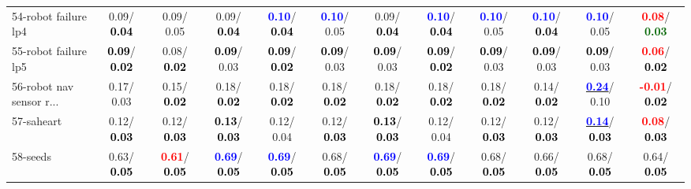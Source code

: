 \begin{table}[h]
\begin{center}
{\begin{tabular}{lc|c|c|c|c|c|c|c|c|c|c}
54-robot failure lp4 &   0.09/\textcolor{black}{\textbf{  0.04}} &   0.09/  0.05 &   0.09/\textcolor{black}{\textbf{  0.04}} & \textcolor{blue}{\textbf{  0.10}}/\textcolor{black}{\textbf{  0.04}} & \textcolor{blue}{\textbf{  0.10}}/  0.05 &   0.09/\textcolor{black}{\textbf{  0.04}} & \textcolor{blue}{\textbf{  0.10}}/\textcolor{black}{\textbf{  0.04}} & \textcolor{blue}{\textbf{  0.10}}/  0.05 & \textcolor{blue}{\textbf{  0.10}}/\textcolor{black}{\textbf{  0.04}} & \textcolor{blue}{\textbf{  0.10}}/  0.05 & \textcolor{red}{\textbf{  0.08}}/\textcolor{darkgreen}{\textbf{  0.03}} \\
55-robot failure lp5 & \textcolor{black}{\textbf{  0.09}}/\textcolor{black}{\textbf{  0.02}} &   0.08/\textcolor{black}{\textbf{  0.02}} & \textcolor{black}{\textbf{  0.09}}/  0.03 & \textcolor{black}{\textbf{  0.09}}/\textcolor{black}{\textbf{  0.02}} & \textcolor{black}{\textbf{  0.09}}/  0.03 & \textcolor{black}{\textbf{  0.09}}/  0.03 & \textcolor{black}{\textbf{  0.09}}/\textcolor{black}{\textbf{  0.02}} & \textcolor{black}{\textbf{  0.09}}/  0.03 & \textcolor{black}{\textbf{  0.09}}/  0.03 & \textcolor{black}{\textbf{  0.09}}/  0.03 & \textcolor{red}{\textbf{  0.06}}/\textcolor{black}{\textbf{  0.02}} \\
56-robot nav sensor r... &   0.17/  0.03 &   0.15/\textcolor{black}{\textbf{  0.02}} &   0.18/\textcolor{black}{\textbf{  0.02}} &   0.18/\textcolor{black}{\textbf{  0.02}} &   0.18/\textcolor{black}{\textbf{  0.02}} &   0.18/\textcolor{black}{\textbf{  0.02}} &   0.18/\textcolor{black}{\textbf{  0.02}} &   0.18/\textcolor{black}{\textbf{  0.02}} &   0.14/\textcolor{black}{\textbf{  0.02}} & \underline{\textcolor{blue}{\textbf{  0.24}}}/  0.10 & \textcolor{red}{\textbf{ -0.01}}/\textcolor{black}{\textbf{  0.02}} \\
57-saheart &   0.12/\textcolor{black}{\textbf{  0.03}} &   0.12/\textcolor{black}{\textbf{  0.03}} & \textcolor{black}{\textbf{  0.13}}/\textcolor{black}{\textbf{  0.03}} &   0.12/  0.04 &   0.12/\textcolor{black}{\textbf{  0.03}} & \textcolor{black}{\textbf{  0.13}}/\textcolor{black}{\textbf{  0.03}} &   0.12/  0.04 &   0.12/\textcolor{black}{\textbf{  0.03}} &   0.12/\textcolor{black}{\textbf{  0.03}} & \underline{\textcolor{blue}{\textbf{  0.14}}}/\textcolor{black}{\textbf{  0.03}} & \textcolor{red}{\textbf{  0.08}}/\textcolor{black}{\textbf{  0.03}} \\
58-seeds &   0.63/\textcolor{black}{\textbf{  0.05}} & \textcolor{red}{\textbf{  0.61}}/\textcolor{black}{\textbf{  0.05}} & \textcolor{blue}{\textbf{  0.69}}/\textcolor{black}{\textbf{  0.05}} & \textcolor{blue}{\textbf{  0.69}}/\textcolor{black}{\textbf{  0.05}} &   0.68/\textcolor{black}{\textbf{  0.05}} & \textcolor{blue}{\textbf{  0.69}}/\textcolor{black}{\textbf{  0.05}} & \textcolor{blue}{\textbf{  0.69}}/\textcolor{black}{\textbf{  0.05}} &   0.68/\textcolor{black}{\textbf{  0.05}} &   0.66/\textcolor{black}{\textbf{  0.05}} &   0.68/\textcolor{black}{\textbf{  0.05}} &   0.64/\textcolor{black}{\textbf{  0.05}} \\

\end{tabular}}
\end{center}
\end{table}
